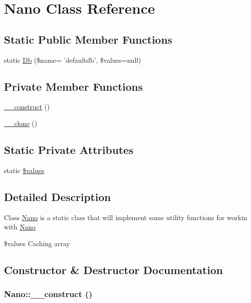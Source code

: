 \hypertarget{classNano}{
\section{Nano Class Reference}
\label{classNano}
}
\subsection*{Static Public Member Functions}
\begin{CompactItemize}
\item 
static \hyperlink{classNano_abd2e5c3823a0c0d688b457f882d4c6d}{Db} (\$name= 'defaultdb', \$values=null)
\end{CompactItemize}
\subsection*{Private Member Functions}
\begin{CompactItemize}
\item 
\hyperlink{classNano_f1689d20148e1cae59e894b7d31184d3}{\_\-\_\-construct} ()
\item 
\hyperlink{classNano_2aa8b559faccc04acba9cfea57952630}{\_\-\_\-clone} ()
\end{CompactItemize}
\subsection*{Static Private Attributes}
\begin{CompactItemize}
\item 
static \hyperlink{classNano_76e01b9737296404395374307ed1edf5}{\$values}
\end{CompactItemize}


\subsection{Detailed Description}
Class \hyperlink{classNano}{Nano} is a static class that will implement some utility functions for workin with \hyperlink{classNano}{Nano}

\$values Caching array 

\subsection{Constructor \& Destructor Documentation}
\hypertarget{classNano_f1689d20148e1cae59e894b7d31184d3}{
\subsubsection[{\_\-\_\-construct}]{\setlength{\rightskip}{0pt plus 5cm}Nano::\_\-\_\-construct ()}}
\label{classNano_f1689d20148e1cae59e894b7d31184d3}


